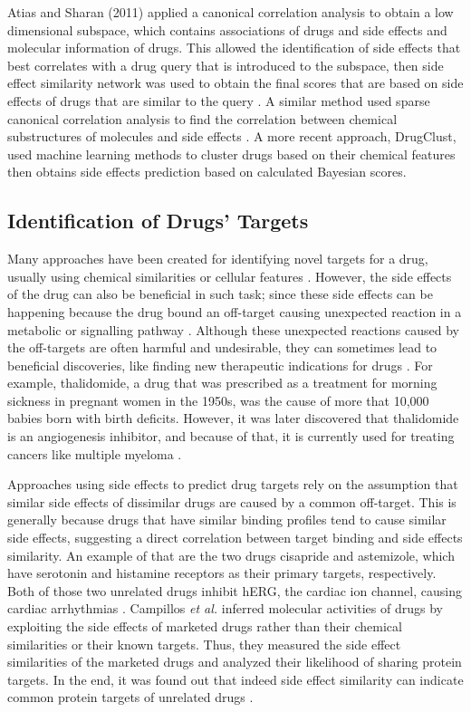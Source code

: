 Atias and Sharan (2011) applied a canonical correlation analysis to obtain a low dimensional subspace, which contains associations of drugs and side effects and molecular information of drugs. This allowed the identification of side effects that best correlates with a drug query that is introduced to the subspace, then side effect similarity network was used to obtain the final scores that are based on side effects of drugs that are similar to the query \cite{atias_algorithmic_2011}. A similar method used sparse canonical correlation analysis to find the correlation between chemical substructures of molecules and side effects \cite{pauwels_predicting_2011}. A more recent approach, DrugClust, used machine learning methods to cluster drugs based on their chemical features then obtains side effects prediction based on calculated Bayesian scores\cite{dimitri_drugclust:_2017}.

\subsection{Identification of Drugs' Targets}
Many approaches have been created for identifying novel targets for a drug, usually using chemical similarities or cellular features \cite{campillos_drug_2008}. However, the side effects of the drug can also be beneficial in such task; since these side effects can be happening because the drug bound an off-target causing unexpected reaction in a metabolic or signalling pathway \cite{lotfi_shahreza_review_2018}. Although these unexpected reactions caused by the off-targets are often harmful and undesirable, they can sometimes lead to beneficial discoveries, like finding new therapeutic indications for drugs \cite{campillos_drug_2008}. For example, thalidomide, a drug that was prescribed as a treatment for morning sickness in pregnant women in the 1950s, was the cause of more that 10,000 babies born with birth deficits. However, it was later discovered that thalidomide is an angiogenesis inhibitor, and because of that, it is currently used for treating cancers like multiple myeloma \cite{vargesson_thalidomideinduced_2015}.

Approaches using side effects to predict drug targets rely on the assumption that similar side effects of dissimilar drugs are caused by a common off-target. This is generally because drugs that have similar binding profiles tend to cause similar side effects, suggesting a direct correlation between target binding and side effects similarity. An example of that are the two drugs cisapride and astemizole, which have serotonin and histamine receptors as their primary targets, respectively. Both of those two unrelated drugs inhibit hERG, the cardiac ion channel, causing cardiac arrhythmias \cite{campillos_drug_2008}.
Campillos \textit{et al.} inferred molecular activities of drugs by exploiting the side effects of marketed drugs rather than their chemical similarities or their known targets. Thus, they measured the side effect similarities of the marketed drugs and analyzed their likelihood of sharing protein targets. In the end, it was found out that indeed side effect similarity can indicate common protein targets of unrelated drugs \cite{campillos_drug_2008}.

